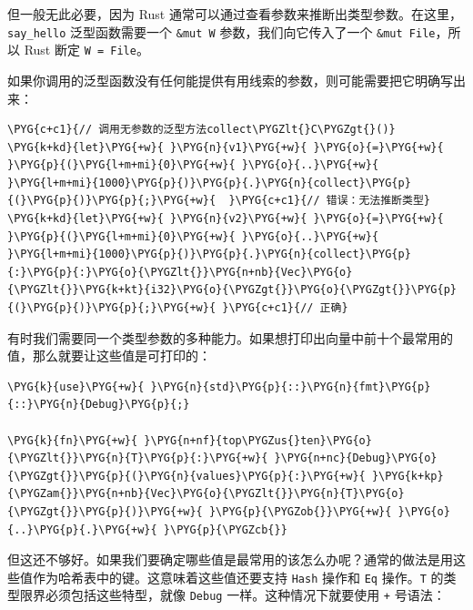但一般无此必要，因为 Rust 通常可以通过查看参数来推断出类型参数。在这里，\texttt{say\_hello} 泛型函数需要一个 \texttt{\&mut W} 参数，我们向它传入了一个 \texttt{\&mut File}，所以 Rust 断定 \texttt{W = File}。

如果你调用的泛型函数没有任何能提供有用线索的参数，则可能需要把它明确写出来：

\begin{Verbatim}[commandchars=\\\{\},breaklines=true,breakanywhere=true,fontsize=\codefont,xleftmargin=17bp]
\PYG{c+c1}{// 调用无参数的泛型方法collect\PYGZlt{}C\PYGZgt{}()}
\PYG{k+kd}{let}\PYG{+w}{ }\PYG{n}{v1}\PYG{+w}{ }\PYG{o}{=}\PYG{+w}{ }\PYG{p}{(}\PYG{l+m+mi}{0}\PYG{+w}{ }\PYG{o}{..}\PYG{+w}{ }\PYG{l+m+mi}{1000}\PYG{p}{)}\PYG{p}{.}\PYG{n}{collect}\PYG{p}{(}\PYG{p}{)}\PYG{p}{;}\PYG{+w}{  }\PYG{c+c1}{// 错误：无法推断类型}
\PYG{k+kd}{let}\PYG{+w}{ }\PYG{n}{v2}\PYG{+w}{ }\PYG{o}{=}\PYG{+w}{ }\PYG{p}{(}\PYG{l+m+mi}{0}\PYG{+w}{ }\PYG{o}{..}\PYG{+w}{ }\PYG{l+m+mi}{1000}\PYG{p}{)}\PYG{p}{.}\PYG{n}{collect}\PYG{p}{:}\PYG{p}{:}\PYG{o}{\PYGZlt{}}\PYG{n+nb}{Vec}\PYG{o}{\PYGZlt{}}\PYG{k+kt}{i32}\PYG{o}{\PYGZgt{}}\PYG{o}{\PYGZgt{}}\PYG{p}{(}\PYG{p}{)}\PYG{p}{;}\PYG{+w}{ }\PYG{c+c1}{// 正确}
\end{Verbatim}

有时我们需要同一个类型参数的多种能力。如果想打印出向量中前十个最常用的值，那么就要让这些值是可打印的：

\begin{Verbatim}[commandchars=\\\{\},breaklines=true,breakanywhere=true,fontsize=\codefont,xleftmargin=17bp]
\PYG{k}{use}\PYG{+w}{ }\PYG{n}{std}\PYG{p}{::}\PYG{n}{fmt}\PYG{p}{::}\PYG{n}{Debug}\PYG{p}{;}

\PYG{k}{fn}\PYG{+w}{ }\PYG{n+nf}{top\PYGZus{}ten}\PYG{o}{\PYGZlt{}}\PYG{n}{T}\PYG{p}{:}\PYG{+w}{ }\PYG{n+nc}{Debug}\PYG{o}{\PYGZgt{}}\PYG{p}{(}\PYG{n}{values}\PYG{p}{:}\PYG{+w}{ }\PYG{k+kp}{\PYGZam{}}\PYG{n+nb}{Vec}\PYG{o}{\PYGZlt{}}\PYG{n}{T}\PYG{o}{\PYGZgt{}}\PYG{p}{)}\PYG{+w}{ }\PYG{p}{\PYGZob{}}\PYG{+w}{ }\PYG{o}{..}\PYG{p}{.}\PYG{+w}{ }\PYG{p}{\PYGZcb{}}
\end{Verbatim}

但这还不够好。如果我们要确定哪些值是最常用的该怎么办呢？通常的做法是用这些值作为哈希表中的键。这意味着这些值还要支持 \texttt{Hash} 操作和 \texttt{Eq} 操作。\texttt{T} 的类型限界必须包括这些特型，就像 \texttt{Debug} 一样。这种情况下就要使用 \texttt{+} 号语法：


